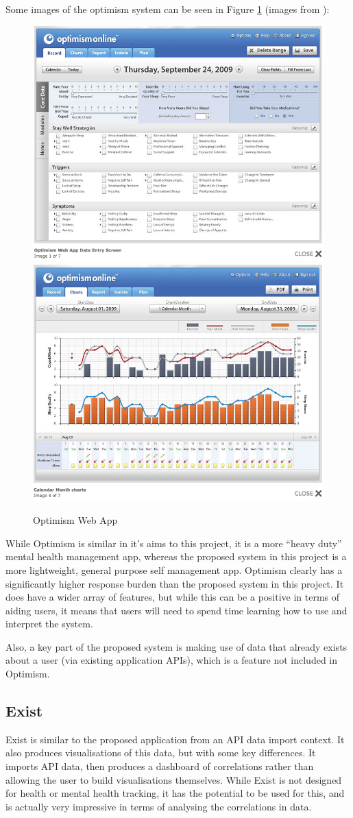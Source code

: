 \documentclass[11pt,openright,a4paper]{report}
\begin{document}
\newpage
Some images of the optimism system can be seen in Figure \ref{fig:optimism} (images from \parencite{optimism}):
\begin{figure}[ht]
\centering
\caption{Optimism Web App}
\includegraphics[width=.5\textwidth]{i/optimism1.png}\hfill
\includegraphics[width=.5\textwidth]{i/optimism2.png}
\label{fig:optimism}
\end{figure}

While Optimism is similar in it's aims to this project, it is a more \enquote{heavy duty} mental health management app, whereas the proposed system in this project is a more lightweight, general purpose self management app. Optimism clearly has a significantly higher response burden than the proposed system in this project. It does have a wider array of features, but while this can be a positive in terms of aiding users, it means that users will need to spend time learning how to use and interpret the system.

Also, a key part of the proposed system is making use of data that already exists about a user (via existing application APIs), which is a feature not included in Optimism.

\subsection{Exist} \label{exist}
Exist \parencite{exist} is similar to the proposed application from an API data import context. It also produces visualisations of this data, but with some key differences. It imports API data, then produces a dashboard of correlations rather than allowing the user to build visualisations themselves. While Exist is not designed for health or mental health tracking, it has the potential to be used for this, and is actually very impressive in terms of analysing the correlations in data.
\end{document}
